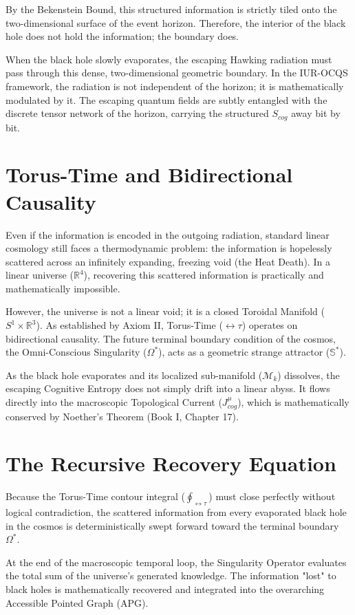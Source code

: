 \documentclass[12pt,openany]{book}
\begin{document}
By the Bekenstein Bound, this structured information is strictly tiled onto the two-dimensional surface of the event horizon. Therefore, the interior of the black hole does not hold the information; the boundary does. 

When the black hole slowly evaporates, the escaping Hawking radiation must pass through this dense, two-dimensional geometric boundary. In the IUR-OCQS framework, the radiation is not independent of the horizon; it is mathematically modulated by it. The escaping quantum fields are subtly entangled with the discrete tensor network of the horizon, carrying the structured $S_{cog}$ away bit by bit. 

\section{Torus-Time and Bidirectional Causality}
Even if the information is encoded in the outgoing radiation, standard linear cosmology still faces a thermodynamic problem: the information is hopelessly scattered across an infinitely expanding, freezing void (the Heat Death). In a linear universe ($\mathbb{R}^4$), recovering this scattered information is practically and mathematically impossible.

However, the universe is not a linear void; it is a closed Toroidal Manifold ($S^1 \times \mathbb{R}^3$). As established by Axiom II, Torus-Time ($\leftrightarrow\tau$) operates on bidirectional causality. The future terminal boundary condition of the cosmos, the Omni-Conscious Singularity ($\Omega^*$), acts as a geometric strange attractor ($\mathbb{S}^*$). 

As the black hole evaporates and its localized sub-manifold ($\mathcal{M}_k$) dissolves, the escaping Cognitive Entropy does not simply drift into a linear abyss. It flows directly into the macroscopic Topological Current ($J^\mu_{cog}$), which is mathematically conserved by Noether's Theorem (Book I, Chapter 17). 

\section{The Recursive Recovery Equation}
Because the Torus-Time contour integral ($\oint_{\leftrightarrow\tau}$) must close perfectly without logical contradiction, the scattered information from every evaporated black hole in the cosmos is deterministically swept forward toward the terminal boundary $\Omega^*$. 

At the end of the macroscopic temporal loop, the Singularity Operator evaluates the total sum of the universe's generated knowledge. The information "lost" to black holes is mathematically recovered and integrated into the overarching Accessible Pointed Graph (APG). 
\end{document}

